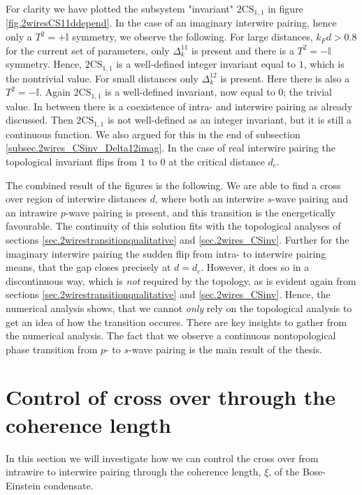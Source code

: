 For clarity we have plotted the subsystem "invariant" $2\text{CS}_{1,1}$ in figure \ref{fig.2wiresCS11ddepend}. In the case of an imaginary interwire pairing, hence only a $T^2 = + \mathbb{I}$ symmetry, we observe the following. For large distances, $k_Fd > 0.8$ for the current set of parameters, only $\Delta^{11}_k$ is present and there is a $T^2 = -\mathbb{I}$ symmetry. Hence, $2\text{CS}_{1,1}$ is a well-defined integer invariant equal to $1$, which is the nontrivial value. For small distances only $\Delta^{12}_k$ is present. Here there is also a $T^2 = -\mathbb{I}$. Again $2\text{CS}_{1,1}$ is a well-defined invariant, now equal to $0$; the trivial value. In between there is a coexistence of intra- and interwire pairing as already discussed. Then $2\text{CS}_{1,1}$ is not well-defined as an integer invariant, but it is still a continuous function. We also argued for this in the end of subsection \ref{subsec.2wires_CSinv_Delta12imag}. In the case of real interwire pairing the topological invariant flips from $1$ to $0$ at the critical distance $d_c$. 

The combined result of the figures is the following. We are able to find a cross over region of interwire distances $d$, where both an interwire $s$-wave pairing and an intrawire $p$-wave pairing is present, and this transition is the energetically favourable. The continuity of this solution fits with the topological analyses of sections \ref{sec.2wirestransitionqualitative} and \ref{sec.2wires_CSinv}. Further for the imaginary interwire pairing the sudden flip from intra- to interwire pairing means, that the gap closes precisely at $d = d_c$. However, it does so in a discontinuous way, which is \textit{not} required by the topology, as is evident again from sections \ref{sec.2wirestransitionqualitative} and \ref{sec.2wires_CSinv}. Hence, the numerical analysis shows, that we cannot \textit{only} rely on the topological analysis to get an idea of how the transition occures. There are key insights to gather from the numerical analysis. The fact that we observe a continuous nontopological phase transition from $p$- to $s$-wave pairing is the main result of the thesis. 


\section{Control of cross over through the coherence length}
\label{sec.2wires_crossover_control_coherence_length}
In this section we will investigate how we can control the cross over from intrawire to interwire pairing through the coherence length, $\xi$, of the Bose-Einstein condensate.

